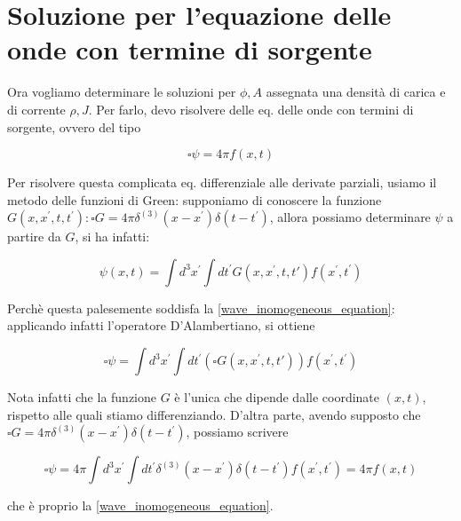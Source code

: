 \documentclass{report}
\begin{document}
\section{Soluzione per l'equazione delle onde con termine di sorgente}

Ora vogliamo determinare le soluzioni per $\phi, A$ assegnata una densità di carica e di corrente $\rho, J$. Per farlo, devo risolvere delle eq. delle onde con termini di sorgente, ovvero del tipo 

\begin{tcolorbox}[colback=doc!15, colframe=black, boxrule=1pt]
\begin{equation}
    \label{wave_inomogeneous_equation}
    \square\psi = 4\pi f(x, t)
\end{equation}
\end{tcolorbox}

Per risolvere questa complicata eq. differenziale alle derivate parziali, usiamo il metodo delle funzioni di Green: supponiamo di conoscere la funzione $G(x, x^{'}, t, t^{'}) : \square G = 4\pi \delta^{(3)}(x-x^{'})\delta(t-t^{'})$, allora possiamo determinare $\psi$ a partire da $G$, si ha infatti: 

\begin{tcolorbox}[colback=doc!15, colframe=black, boxrule=1pt]
\begin{equation}
    \psi(x, t) = \int d^3x^{'}\int dt^{'} G(x, x^{'}, t, t{'})f(x^{'}, t^{'})
\end{equation}
\end{tcolorbox}

Perchè questa palesemente soddisfa la \ref{wave_inomogeneous_equation}: applicando infatti l'operatore D'Alambertiano, si ottiene

\begin{equation}
    \square \psi = \int d^3x^{'}\int dt^{'} (\square G(x, x^{'}, t, t{'}))f(x^{'}, t^{'})
\end{equation}

Nota infatti che la funzione $G$ è l'unica che dipende dalle coordinate $(x, t)$, rispetto alle quali stiamo differenziando. D'altra parte, avendo supposto che $\square G = 4\pi \delta^{(3)}(x-x^{'})\delta(t-t^{'})$, possiamo scrivere 

\begin{equation}
    \square\psi = 4\pi \int d^3x^{'} \int dt^{'}\delta^{(3)}(x-x^{'})\delta(t-t^{'})f(x^{'}, t^{'}) = 4\pi f(x, t)
\end{equation}

che è proprio la \ref{wave_inomogeneous_equation}. 
\end{document}
